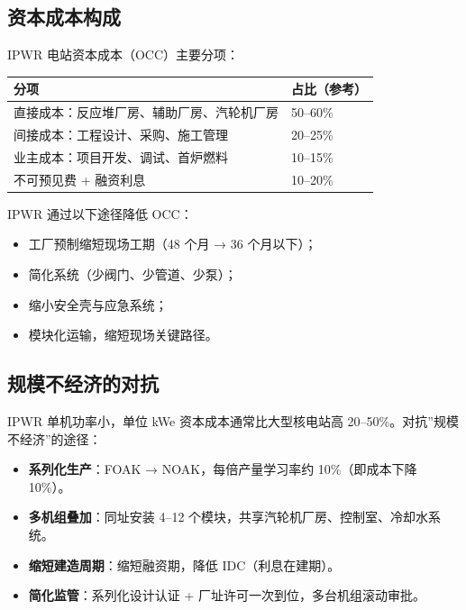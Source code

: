 \documentclass[
  UTF8,
  scheme=plain,
  fontsize=10pt,
  openany
]{ctexbook}
\begin{document}
\subsection{资本成本构成}\label{ux8d44ux672cux6210ux672cux6784ux6210}

IPWR 电站资本成本（OCC）主要分项：

{\def\LTcaptype{none} %
\begin{longtable}[]{@{}ll@{}}
\toprule\noalign{}
分项 & 占比（参考） \\
\midrule\noalign{}
\endhead
\bottomrule\noalign{}
\endlastfoot
直接成本：反应堆厂房、辅助厂房、汽轮机厂房 & 50--60\% \\
间接成本：工程设计、采购、施工管理 & 20--25\% \\
业主成本：项目开发、调试、首炉燃料 & 10--15\% \\
不可预见费 + 融资利息 & 10--20\% \\
\end{longtable}
}

IPWR 通过以下途径降低 OCC：

\begin{itemize}
\tightlist
\item
  工厂预制缩短现场工期（48 个月 → 36 个月以下）；
\item
  简化系统（少阀门、少管道、少泵）；
\item
  缩小安全壳与应急系统；
\item
  模块化运输，缩短现场关键路径。
\end{itemize}

\subsection{规模不经济的对抗}\label{ux89c4ux6a21ux4e0dux7ecfux6d4eux7684ux5bf9ux6297}

IPWR 单机功率小，单位 kWe 资本成本通常比大型核电站高
20--50\%。对抗''规模不经济''的途径：

\begin{itemize}
\tightlist
\item
  \textbf{系列化生产}：FOAK → NOAK，每倍产量学习率约 10\%（即成本下降
  10\%）。
\item
  \textbf{多机组叠加}：同址安装 4--12
  个模块，共享汽轮机厂房、控制室、冷却水系统。
\item
  \textbf{缩短建造周期}：缩短融资期，降低 IDC（利息在建期）。
\item
  \textbf{简化监管}：系列化设计认证 +
  厂址许可一次到位，多台机组滚动审批。
\end{itemize}
\end{document}
